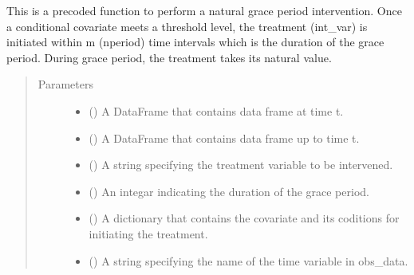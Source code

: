 \documentclass[letterpaper,10pt,english]{sphinxmanual}
\begin{document}
\begin{fulllineitems}
\label{\detokenize{Specifications/Intervention:pygformula.parametric_gformula.interventions.natural_grace_period}}
\sphinxAtStartPar
This is a pre\sphinxhyphen{}coded function to perform a natural grace period intervention. Once a conditional covariate
meets a threshold level, the treatment (int\_var) is initiated within m (nperiod) time intervals which is the duration
of the grace period. During grace period, the treatment takes its natural value.
\begin{quote}\begin{description}
\item[{Parameters}] \leavevmode\begin{itemize}
\item {} 
\sphinxAtStartPar
{} () \textendash{} A DataFrame that contains data frame at time t.

\item {} 
\sphinxAtStartPar
{} () \textendash{} A DataFrame that contains data frame up to time t.

\item {} 
\sphinxAtStartPar
{} () \textendash{} A string specifying the treatment variable to be intervened.

\item {} 
\sphinxAtStartPar
{} () \textendash{} An integar indicating the duration of the grace period.

\item {} 
\sphinxAtStartPar
{} () \textendash{} A dictionary that contains the covariate and its coditions for initiating the treatment.

\item {} 
\sphinxAtStartPar
{} () \textendash{} A string specifying the name of the time variable in obs\_data.


\end{itemize}
\end{description}
\end{quote}
\end{fulllineitems}
\end{document}
